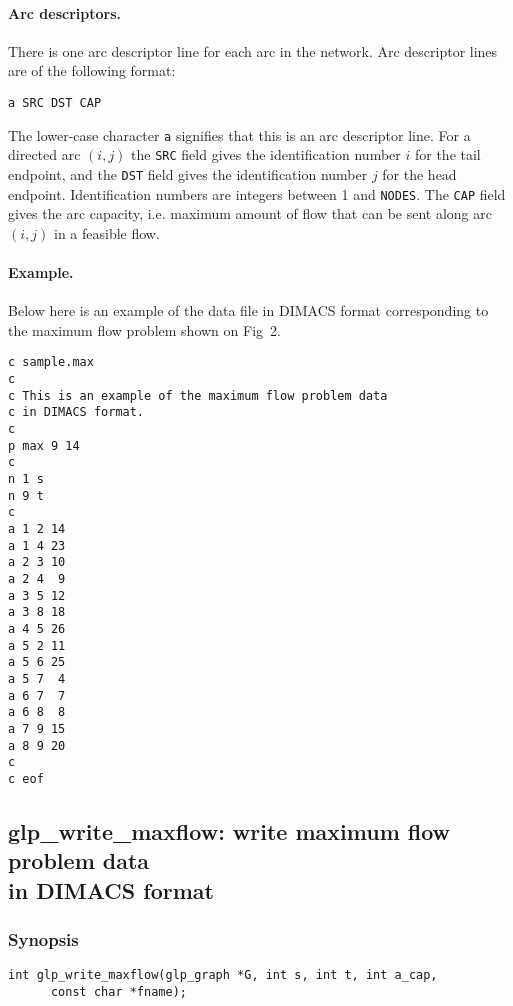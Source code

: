 \paragraph{Arc descriptors.} There is one arc descriptor line for each
arc in the network. Arc descriptor lines are of the following format:

\begin{verbatim}
a SRC DST CAP
\end{verbatim}

\noindent
The lower-case character \verb|a| signifies that this is an arc
descriptor line. For a directed arc $(i,j)$ the \verb|SRC| field gives
the identification number $i$ for the tail endpoint, and the \verb|DST|
field gives the identification number $j$ for the head endpoint.
Identification numbers are integers between 1 and \verb|NODES|. The
\verb|CAP| field gives the arc capacity, i.e. maximum amount of flow
that can be sent along arc $(i,j)$ in a feasible flow.

\newpage

\paragraph{Example.} Below here is an example of the data file in
DIMACS format corresponding to the maximum flow problem shown on Fig~2.

\begin{verbatim}
c sample.max
c
c This is an example of the maximum flow problem data
c in DIMACS format.
c
p max 9 14
c
n 1 s
n 9 t
c
a 1 2 14
a 1 4 23
a 2 3 10
a 2 4  9
a 3 5 12
a 3 8 18
a 4 5 26
a 5 2 11
a 5 6 25
a 5 7  4
a 6 7  7
a 6 8  8
a 7 9 15
a 8 9 20
c
c eof
\end{verbatim}

\newpage

\subsection{glp\_write\_maxflow: write maximum flow problem data\\
in DIMACS format}

\subsubsection*{Synopsis}

\begin{verbatim}
int glp_write_maxflow(glp_graph *G, int s, int t, int a_cap,
      const char *fname);
\end{verbatim}

